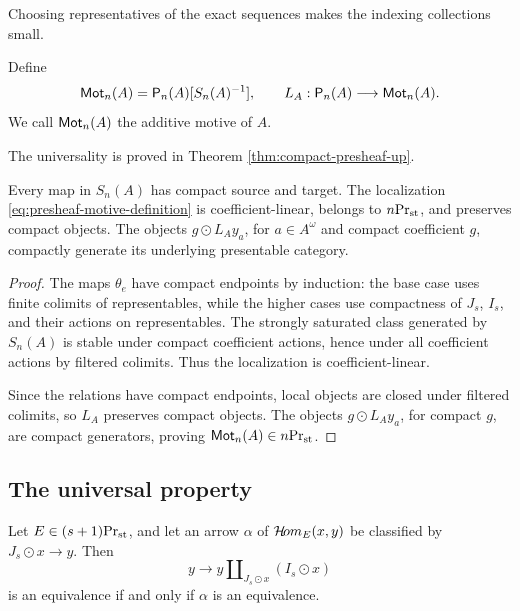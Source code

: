 Choosing representatives of the exact sequences makes the indexing
collections small.


\begin{definition}\label{def:additive-motive}
Define
\begin{equation}\label{eq:presheaf-motive-definition}
 \mathsf{Mot}_n(A)=\mathsf P_n(A)[S_n(A)^{-1}],
 \qquad L_A:\mathsf P_n(A)\longrightarrow\mathsf{Mot}_n(A).
\end{equation}
We call $\mathsf{Mot}_n(A)$ the additive motive of $A$.
\end{definition}

The universality is proved in Theorem \ref{thm:compact-presheaf-up}.


\begin{lemma}\label{lem:compact-module-localization}
Every map in $S_n(A)$ has compact source and target. The localization
\eqref{eq:presheaf-motive-definition} is coefficient-linear, belongs to
${n}\mathrm{Pr}_{\mathrm{st}}$, and preserves compact objects. The objects $g\odot L_Ay_a$,
for $a\in A^\omega$ and compact coefficient $g$, compactly generate its
underlying presentable category.
\end{lemma}


\begin{proof}
The maps $\theta_e$ have compact endpoints
by induction: the base case uses finite colimits
of representables, while the higher cases use
compactness of $J_s$, $I_s$, and their actions
on representables.
The strongly saturated class generated by
$S_n(A)$ is stable under compact coefficient
actions, hence under all coefficient actions
by filtered colimits. Thus the localization
is coefficient-linear.

Since the relations have compact endpoints,
local objects are closed under filtered colimits,
so $L_A$ preserves compact objects.
The objects $g\odot L_Ay_a$, for compact $g$,
are compact generators, proving
$\mathsf{Mot}_n(A)\in{n}\mathrm{Pr}_{\mathrm{st}}$.
\end{proof}


\subsection{The universal property}

\begin{lemma}\label{lem:outgoing-coinverter}
Let $E\in{(s+1)}\mathrm{Pr}_{\mathrm{st}}$, and let an arrow $\alpha$ of
$\mathcal{H}\!om_E(x,y)$ be classified by $J_s\odot x\to y$. Then
\[
 y\longrightarrow y\amalg_{J_s\odot x}(I_s\odot x)
\]
is an equivalence if and only if $\alpha$ is an equivalence.
\end{lemma}

